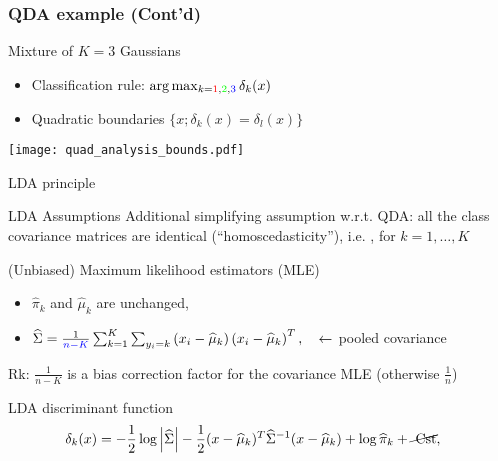 \begin{frame}
  \frametitle{QDA example (Cont'd)}
\begin{block}{Mixture of $K=3$ Gaussians}
\begin{itemize}
   \item  Classification rule: $\arg \max_{k=\textcolor{red}{1},\textcolor{green}{2},\textcolor{blue}{3}}
\delta_k(x)$
\item Quadratic boundaries $\{ x ; \delta_k(x)=\delta_l(x) \} $
\end{itemize}
\end{block}

\begin{center}
  \texttt{[image: quad\_analysis\_bounds.pdf]} \\
\end{center}

\end{frame}




\begin{frame}{LDA principle}

\begin{block}{LDA Assumptions}
Additional simplifying assumption w.r.t. QDA: all the class covariance matrices are identical (``homoscedasticity''), i.e. , for $k=1,\ldots,K$
\end{block}\medskip

\begin{block}{(Unbiased) Maximum likelihood estimators (MLE)}
\begin{itemize}
 \item $\widehat{\pi}_k$ and $\widehat{\mu}_k$ are unchanged,
 \item $\widehat{\Sigma} = \frac{1}{{\textcolor{blue}{n-K}}} \sum_{k=1}^K \sum_{y_i=k} \left(x_i-\widehat{\mu}_k \right) \left(x_i-\widehat{\mu}_k \right)^T,
 \quad \leftarrow $ pooled  covariance
\end{itemize}
Rk:  $\frac{1}{n-K}$ is a bias correction factor for the covariance MLE (otherwise $\frac{1}{n}$)
\end{block}\medskip

\begin{block}{LDA discriminant function}
\begin{align*}
 \delta_k(x)&= -\frac{1}{2} \log\left|\widehat{\Sigma}\right| - \frac{1}{2}
 (x-\widehat{\mu}_k)^T \widehat{\Sigma}^{-1} (x-\widehat{\mu}_k)+ \log \widehat{\pi}_k + \cancel{ \textrm{ Cst} },
\end{align*}
\end{block}
\end{frame}



